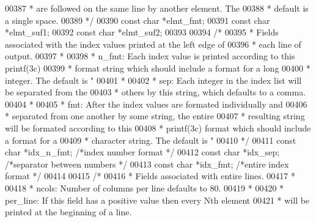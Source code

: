 \begin{DoxyCode}
{{{{{{{{{{{{{{{00387 \textcolor{comment}{     *              are followed on the same line by another element.  The}
00388 \textcolor{comment}{     *              default is a single space.}
00389 \textcolor{comment}{     */}
00390     \textcolor{keyword}{const} \textcolor{keywordtype}{char}  *elmt\_fmt;
00391     \textcolor{keyword}{const} \textcolor{keywordtype}{char}  *elmt\_suf1;
00392     \textcolor{keyword}{const} \textcolor{keywordtype}{char}  *elmt\_suf2;
00393 
00394     \textcolor{comment}{/*}
00395 \textcolor{comment}{     * Fields associated with the index values printed at the left edge of}
00396 \textcolor{comment}{     * each line of output.}
00397 \textcolor{comment}{     *}
00398 \textcolor{comment}{     *   n\_fmt:     Each index value is printed according to this printf(3c)}
00399 \textcolor{comment}{     *              format string which should include a format for a long}
00400 \textcolor{comment}{     *              integer.  The default is "%
00401 \textcolor{comment}{     *}
00402 \textcolor{comment}{     *   sep:       Each integer in the index list will be separated from the}
00403 \textcolor{comment}{     *              others by this string, which defaults to a comma.}
00404 \textcolor{comment}{     *}
00405 \textcolor{comment}{     *   fmt:       After the index values are formated individually and}
00406 \textcolor{comment}{     *              separated from one another by some string, the entire}
00407 \textcolor{comment}{     *              resulting string will be formated according to this}
00408 \textcolor{comment}{     *              printf(3c) format which should include a format for a}
00409 \textcolor{comment}{     *              character string.  The default is "%
00410 \textcolor{comment}{     */}
00411     \textcolor{keyword}{const} \textcolor{keywordtype}{char}  *idx\_n\_fmt;             \textcolor{comment}{/*index number format           */}
00412     \textcolor{keyword}{const} \textcolor{keywordtype}{char}  *idx\_sep;               \textcolor{comment}{/*separator between numbers     */}
00413     \textcolor{keyword}{const} \textcolor{keywordtype}{char}  *idx\_fmt;               \textcolor{comment}{/*entire index format           */}
00414 
00415     \textcolor{comment}{/*}
00416 \textcolor{comment}{     * Fields associated with entire lines.}
00417 \textcolor{comment}{     *}
00418 \textcolor{comment}{     *   ncols:     Number of columns per line defaults to 80.}
00419 \textcolor{comment}{     *}
00420 \textcolor{comment}{     *   per\_line:  If this field has a positive value then every Nth element}
00421 \textcolor{comment}{     *              will be printed at the beginning of a line.}
}}}}}}}}}}}}}}}}}
\end{DoxyCode}
